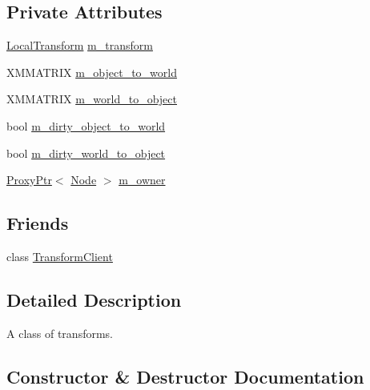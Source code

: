 \subsection*{Private Attributes}
\begin{DoxyCompactItemize}
\item 
\hyperlink{classmage_1_1_local_transform}{Local\+Transform} \hyperlink{classmage_1_1_transform_ab3d4fe66cef3bad3f3d335e497c3d769}{m\+\_\+transform}
\item 
X\+M\+M\+A\+T\+R\+IX \hyperlink{classmage_1_1_transform_a4e227321c984ddf2ece92d7954ae5db9}{m\+\_\+object\+\_\+to\+\_\+world}
\item 
X\+M\+M\+A\+T\+R\+IX \hyperlink{classmage_1_1_transform_a873fefd93a3c1ca938e2bbecdbc5b3ac}{m\+\_\+world\+\_\+to\+\_\+object}
\item 
bool \hyperlink{classmage_1_1_transform_a37b39fe67eaf4dc64d4b2c87b8868c4e}{m\+\_\+dirty\+\_\+object\+\_\+to\+\_\+world}
\item 
bool \hyperlink{classmage_1_1_transform_af0778d1dbe677b7af16add3c14a6259e}{m\+\_\+dirty\+\_\+world\+\_\+to\+\_\+object}
\item 
\hyperlink{classmage_1_1_proxy_ptr}{Proxy\+Ptr}$<$ \hyperlink{classmage_1_1_node}{Node} $>$ \hyperlink{classmage_1_1_transform_a3cf772460725cbb2d939f1f558e1d60c}{m\+\_\+owner}
\end{DoxyCompactItemize}
\subsection*{Friends}
\begin{DoxyCompactItemize}
\item 
class \hyperlink{classmage_1_1_transform_af7bc9408e1e31d66cb7fd971ff437a3a}{Transform\+Client}
\end{DoxyCompactItemize}


\subsection{Detailed Description}
A class of transforms. 

\subsection{Constructor \& Destructor Documentation}
\hypertarget{classmage_1_1_transform_a0fe54a3ac740025755d567a423c39de0}{}\label{classmage_1_1_transform_a0fe54a3ac740025755d567a423c39de0} 
